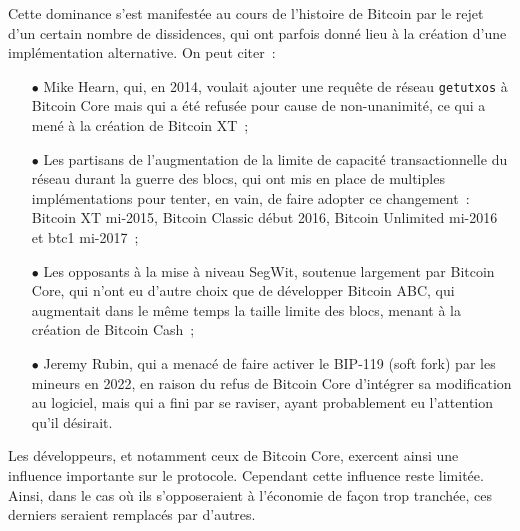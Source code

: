
Cette dominance s'est manifestée au cours de l'histoire de Bitcoin par le rejet d'un certain nombre de dissidences, qui ont parfois donné lieu à la création d'une implémentation alternative. On peut citer~:

\begin{itemize}
\item[$\bullet$] Mike Hearn, qui, en 2014, voulait ajouter une requête de réseau \texttt{getutxos} à Bitcoin Core mais qui a été refusée pour cause de non-unanimité, ce qui a mené à la création de Bitcoin XT~;
\item[$\bullet$] Les partisans de l'augmentation de la limite de capacité transactionnelle du réseau durant la guerre des blocs, qui ont mis en place de multiples implémentations pour tenter, en vain, de faire adopter ce changement~: Bitcoin XT mi-2015, Bitcoin Classic début 2016, Bitcoin Unlimited mi-2016 et btc1 mi-2017~;
\item[$\bullet$] Les opposants à la mise à niveau SegWit, soutenue largement par Bitcoin Core, qui n'ont eu d'autre choix que de développer Bitcoin ABC, qui augmentait dans le même temps la taille limite des blocs, menant à la création de Bitcoin Cash~;
\item[$\bullet$] Jeremy Rubin, qui a menacé de faire activer le BIP-119 (soft fork) par les mineurs en 2022, en raison du refus de Bitcoin Core d'intégrer sa modification au logiciel, mais qui a fini par se raviser, ayant probablement eu l'attention qu'il désirait.
\end{itemize}

Les développeurs, et notamment ceux de Bitcoin Core, exercent ainsi une influence importante sur le protocole. Cependant cette influence reste limitée. Ainsi, dans le cas où ils s'opposeraient à l'économie de façon trop tranchée, ces derniers seraient remplacés par d'autres.

